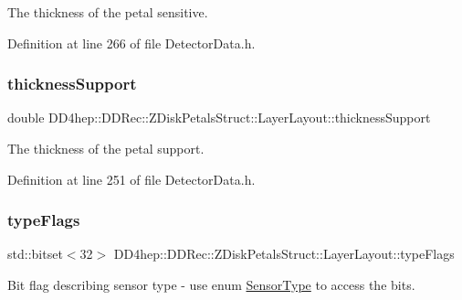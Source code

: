 The thickness of the petal sensitive. 



Definition at line 266 of file Detector\+Data.\+h.

\hypertarget{struct_d_d4hep_1_1_d_d_rec_1_1_z_disk_petals_struct_1_1_layer_layout_a49467ec112b66d8cf7be0276d2c0db9d}{}\label{struct_d_d4hep_1_1_d_d_rec_1_1_z_disk_petals_struct_1_1_layer_layout_a49467ec112b66d8cf7be0276d2c0db9d} 
\subsubsection{\texorpdfstring{thickness\+Support}{thicknessSupport}}
{\footnotesize\ttfamily double D\+D4hep\+::\+D\+D\+Rec\+::\+Z\+Disk\+Petals\+Struct\+::\+Layer\+Layout\+::thickness\+Support}



The thickness of the petal support. 



Definition at line 251 of file Detector\+Data.\+h.

\hypertarget{struct_d_d4hep_1_1_d_d_rec_1_1_z_disk_petals_struct_1_1_layer_layout_a20e5c894370d93b960dccbb7b31d167c}{}\label{struct_d_d4hep_1_1_d_d_rec_1_1_z_disk_petals_struct_1_1_layer_layout_a20e5c894370d93b960dccbb7b31d167c} 
\subsubsection{\texorpdfstring{type\+Flags}{typeFlags}}
{\footnotesize\ttfamily std\+::bitset$<$32$>$ D\+D4hep\+::\+D\+D\+Rec\+::\+Z\+Disk\+Petals\+Struct\+::\+Layer\+Layout\+::type\+Flags}



Bit flag describing sensor type -\/ use enum \hyperlink{struct_d_d4hep_1_1_d_d_rec_1_1_z_disk_petals_struct_1_1_sensor_type}{Sensor\+Type} to access the bits. 




